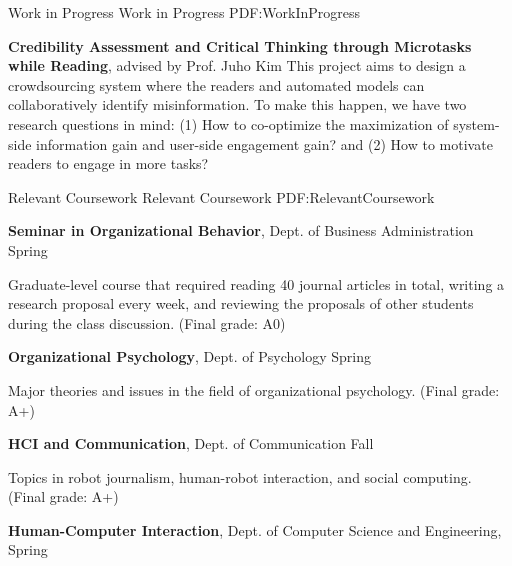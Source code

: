 \documentclass[letterpaper,MMMyyyy,nonstopmode]{template}
\begin{document}
\begin{Body}
\endgroup

\BigGap
\SubSection
{Work in Progress}
{Work in Progress}
{PDF:WorkInProgress}

\begingroup
\renewcommand{\MaxNumberedItem}{[88]}

\BigGap
\NumberedItem{[5]}
  \textbf{Credibility Assessment and Critical Thinking through Microtasks while Reading}, advised by Prof. Juho Kim
  \vspace{2mm}\newline
  {\small{
    This project aims to design a crowdsourcing system where the readers and automated models can collaboratively identify misinformation. To make this happen, we have two research questions in mind: (1) How to co-optimize the maximization of system-side information gain and user-side engagement gain? and (2) How to motivate readers to engage in more tasks? 
  }}

\endgroup


\BigGap
\Section
{Relevant Coursework}
{Relevant Coursework}
{PDF:RelevantCoursework}

\Entry
  \textbf{Seminar in Organizational Behavior},
  Dept. of Business Administration
  \hfill
   Spring

  \begin{Detail}
  \SubBulletItem
    Graduate-level course that required reading 40 journal articles in total, writing a research proposal every week, and reviewing the proposals of other students during the class discussion. (Final grade: A0)
  \end{Detail}

\BigGap
\Entry
  \textbf{Organizational Psychology},
  Dept. of Psychology
  \hfill
   Spring

  \begin{Detail}
  \SubBulletItem
    Major theories and issues in the field of organizational psychology. (Final grade: A+)
  \end{Detail}

\BigGap
\Entry
  \textbf{HCI and Communication},
  Dept. of Communication
  \hfill
   Fall

  \begin{Detail}
  \SubBulletItem
    Topics in robot journalism, human-robot interaction, and social computing. (Final grade: A+)
  \end{Detail}

\BigGap
  \Entry
  \textbf{Human-Computer Interaction},
  Dept. of Computer Science and Engineering,
  \hfill
   Spring


\end{Body}
\end{document}

